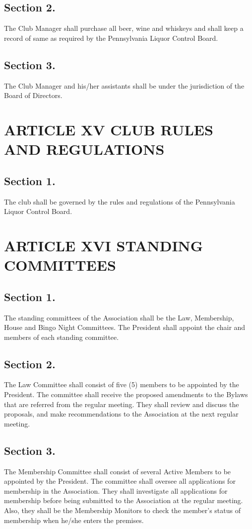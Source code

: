 \documentclass[12pt,letterpaper]{article}
\begin{document}
\subsection*{Section 2.} The Club Manager shall purchase all beer, wine and whiskeys and shall keep
a record of same as required by the Pennsylvania Liquor Control Board.
\subsection*{Section 3.} The Club Manager and his/her assistants shall be under the jurisdiction of
the Board of Directors.

\section*{ARTICLE XV
CLUB RULES AND REGULATIONS}

\subsection*{Section 1.} The club shall be governed by the rules and regulations of the Pennsylvania
Liquor Control Board.

\section*{ARTICLE XVI
STANDING COMMITTEES}

\subsection*{Section 1.} The standing committees of the Association shall be the Law, Membership,
House and Bingo Night Committees. The President shall appoint the chair and members
of each standing committee.
\subsection*{Section 2.} The Law Committee shall consist of five (5) members to be appointed by
the President. The committee shall receive the proposed amendments to the Bylaws
that are referred from the regular meeting. They shall review and discuss the proposals,
and make recommendations to the Association at the next regular meeting.
\subsection*{Section 3.} The Membership Committee shall consist of several Active Members to be
appointed by the President. The committee shall oversee all applications for
membership in the Association. They shall investigate all applications for membership
before being submitted to the Association at the regular meeting. Also, they shall be the
Membership Monitors to check the member’s status of membership when he/she enters
the premises.
\end{document}
